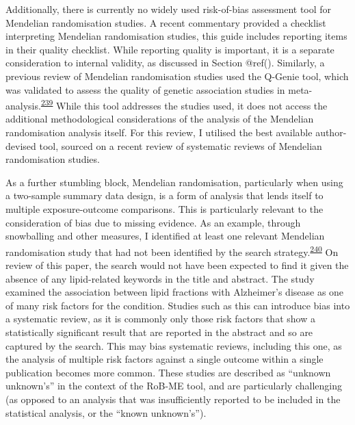 \documentclass[a4paper, twoside]{templates/ociamthesis}
\begin{document}
Additionally, there is currently no widely used risk-of-bias assessment tool for Mendelian randomisation studies. A recent commentary provided a checklist interpreting Mendelian randomisation studies, this guide includes reporting items in their quality checklist. While reporting quality is important, it is a separate consideration to internal validity, as discussed in Section @ref(). Similarly, a previous review of Mendelian randomisation studies used the Q-Genie tool, which was validated to assess the quality of genetic association studies in meta-analysis.\textsuperscript{\protect\hyperlink{ref-sohani2015}{239}} While this tool addresses the studies used, it does not access the additional methodological considerations of the analysis of the Mendelian randomisation analysis itself. For this review, I utilised the best available author-devised tool, sourced on a recent review of systematic reviews of Mendelian randomisation studies.

As a further stumbling block, Mendelian randomisation, particularly when using a two-sample summary data design, is a form of analysis that lends itself to multiple exposure-outcome comparisons. This is particularly relevant to the consideration of bias due to missing evidence. As an example, through snowballing and other measures, I identified at least one relevant Mendelian randomisation study that had not been identified by the search strategy.\textsuperscript{\protect\hyperlink{ref-larsson2017b}{240}} On review of this paper, the search would not have been expected to find it given the absence of any lipid-related keywords in the title and abstract. The study examined the association between lipid fractions with Alzheimer's disease as one of many risk factors for the condition. Studies such as this can introduce bias into a systematic review, as it is commonly only those risk factors that show a statistically significant result that are reported in the abstract and so are captured by the search. This may bias systematic reviews, including this one, as the analysis of multiple risk factors against a single outcome within a single publication becomes more common. These studies are described as ``unknown unknown's'' in the context of the RoB-ME tool, and are particularly challenging (as opposed to an analysis that was insufficiently reported to be included in the statistical analysis, or the ``known unknown's'').
\end{document}

